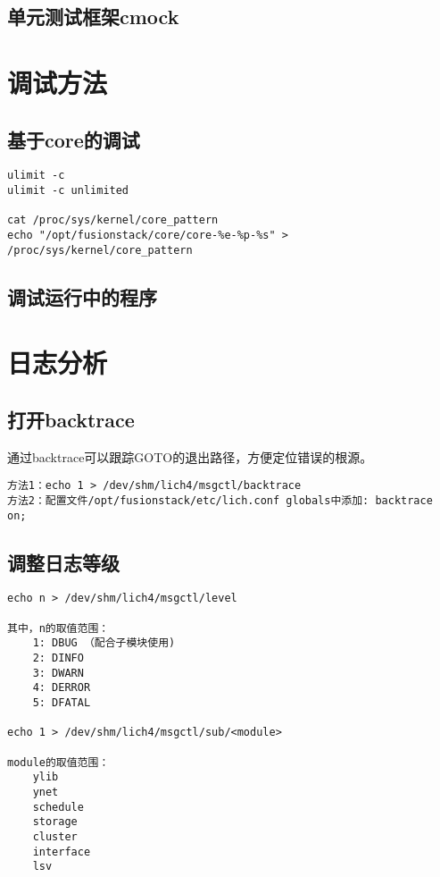 \subsection{单元测试框架cmock}

\section{调试方法}

\subsection{基于core的调试}

\begin{lstlisting}
ulimit -c
ulimit -c unlimited

cat /proc/sys/kernel/core_pattern
echo "/opt/fusionstack/core/core-%e-%p-%s" > /proc/sys/kernel/core_pattern
\end{lstlisting}

\subsection{调试运行中的程序}

\section{日志分析}

\subsection{打开backtrace}

通过backtrace可以跟踪GOTO的退出路径，方便定位错误的根源。

\begin{lstlisting}
方法1：echo 1 > /dev/shm/lich4/msgctl/backtrace
方法2：配置文件/opt/fusionstack/etc/lich.conf globals中添加: backtrace on;
\end{lstlisting}

\subsection{调整日志等级}

\begin{lstlisting}
echo n > /dev/shm/lich4/msgctl/level

其中，n的取值范围：
    1: DBUG （配合子模块使用)
    2: DINFO
    3: DWARN
    4: DERROR
    5: DFATAL

echo 1 > /dev/shm/lich4/msgctl/sub/<module>

module的取值范围：
    ylib
    ynet
    schedule
    storage
    cluster
    interface
    lsv
\end{lstlisting}


